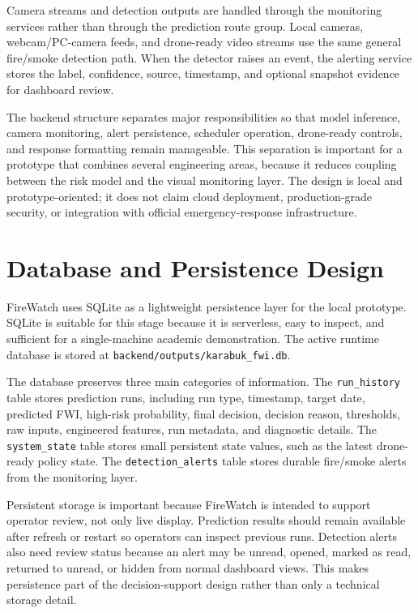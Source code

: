 Camera streams and detection outputs are handled through the monitoring
services rather than through the prediction route group. Local cameras,
webcam/PC-camera feeds, and drone-ready video streams use the same general
fire/smoke detection path. When the detector raises an event, the alerting
service stores the label, confidence, source, timestamp, and optional snapshot
evidence for dashboard review.

The backend structure separates major responsibilities so that model
inference, camera monitoring, alert persistence, scheduler operation,
drone-ready controls, and response formatting remain manageable. This separation is
important for a prototype that combines several engineering areas, because it
reduces coupling between the risk model and the visual monitoring layer. The
design is local and prototype-oriented; it does not claim cloud deployment,
production-grade security, or integration with official emergency-response
infrastructure.

\section{Database and Persistence Design}

FireWatch uses SQLite as a lightweight persistence layer for the local
prototype. SQLite is suitable for this stage because it is serverless, easy to
inspect, and sufficient for a single-machine academic demonstration. The
active runtime database is stored at
\texttt{backend/outputs/karabuk\_fwi.db}.

The database preserves three main categories of information. The
\texttt{run\_history} table stores prediction runs, including run type,
timestamp, target date, predicted FWI, high-risk probability, final decision,
decision reason, thresholds, raw inputs, engineered features, run metadata,
and diagnostic details. The \texttt{system\_state} table stores small persistent state values,
such as the latest drone-ready policy state. The
\texttt{detection\_alerts} table stores durable fire/smoke alerts from the
monitoring layer.

Persistent storage is important because FireWatch is intended to support
operator review, not only live display. Prediction results should remain
available after refresh or restart so operators can inspect previous runs.
Detection alerts also need review status because an alert may be unread,
opened, marked as read, returned to unread, or hidden from normal dashboard
views. This makes persistence part of the decision-support design rather than
only a technical storage detail.

